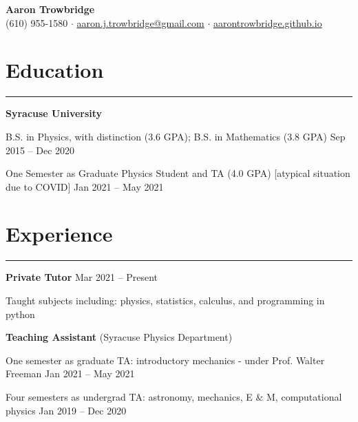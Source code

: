 \documentclass[9pt]{extarticle}
\newcommand{\myline}{\rule[\baselineskip]{\linewidth}{1pt}}
\begin{document}
\begin{center}
\Huge
\textbf{Aaron Trowbridge}\\

\normalsize
(610) 955-1580 $\cdot$ \href{mailto:aaron.j.trowbridge@gmail.com}{aaron.j.trowbridge@gmail.com} $\cdot$ \href{https://aarontrowbridge.github.io/}{aarontrowbridge.github.io} \\

\end{center}


\section{Education}

\myline


\large\textbf{Syracuse University} 

\normalsize
\begin{compactitem}
\setlength\itemsep{0em}
\item B.S. in Physics, with distinction (3.6 GPA); B.S. in Mathematics (3.8 GPA) \hfill \small Sep 2015 -- Dec 2020 
\item One Semester as Graduate Physics Student and TA (4.0 GPA) [atypical situation due to COVID] \hfill \small Jan 2021 -- May 2021

\end{compactitem}


\section{Experience}

\myline

\large\textbf{Private Tutor} \hfill \small Mar 2021 -- Present
\normalsize

\begin{compactitem}
\item Taught subjects including: physics, statistics, calculus, and programming in python
\end{compactitem}

\vspace{2.5pt}
\large\textbf{Teaching Assistant} \normalsize (Syracuse Physics Department)
\normalsize

\begin{compactitem}
\item One semester as graduate TA: introductory mechanics - under Prof. Walter Freeman \hfill \small Jan 2021 -- May 2021
\item Four semesters as undergrad TA: astronomy, mechanics, E $\&$ M, computational physics  \hfill \small Jan 2019 -- Dec 2020
\end{compactitem}
\end{document}
